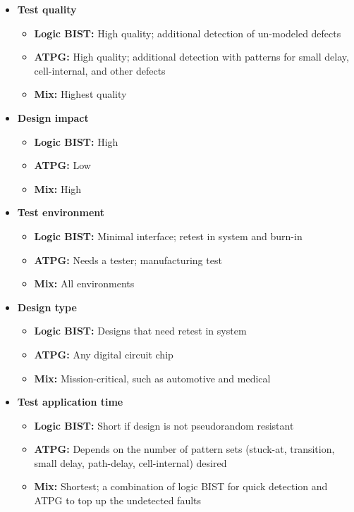\documentclass[12pt, a4paper]{article}
\begin{document}
\begin{itemize}
\item \textbf{Test quality}
\begin{itemize}
\item \textbf{Logic BIST:} High quality; additional detection of un-modeled defects
\item \textbf{ATPG:} High quality; additional detection with patterns for small delay, cell-internal, and other defects
\item \textbf{Mix:} Highest quality
\end{itemize}
\item \textbf{Design impact}
\begin{itemize}
\item \textbf{Logic BIST:} High
\item \textbf{ATPG:} Low
\item \textbf{Mix:} High
\end{itemize}
\item \textbf{Test environment}
\begin{itemize}
\item \textbf{Logic BIST:} Minimal interface; retest in system and burn-in
\item \textbf{ATPG:} Needs a tester; manufacturing test
\item \textbf{Mix:} All environments
\end{itemize}
\item \textbf{Design type}
\begin{itemize}
\item \textbf{Logic BIST:} Designs that need retest in system
\item \textbf{ATPG:} Any digital circuit chip
\item \textbf{Mix:} Mission-critical, such as automotive and medical
\end{itemize}
\item \textbf{Test application time}
\begin{itemize}
\item \textbf{Logic BIST:} Short if design is not pseudorandom resistant
\item \textbf{ATPG:} Depends on the number of pattern sets (stuck-at, transition, small delay, path-delay, cell-internal) desired
\item \textbf{Mix:} Shortest; a combination of logic BIST for quick detection and ATPG to top up the undetected faults
\end{itemize}
\end{itemize}
\end{document}
